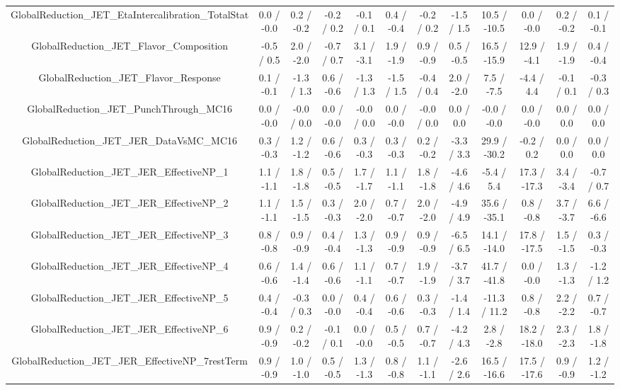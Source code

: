 \begin{table}[htbp]
\begin{center}
\begin{tabular}{|c|c|c|c|c|c|c|c|c|c|c|c|}
  GlobalReduction_JET_EtaIntercalibration_TotalStat & 0.0 / -0.0 & 0.2 / -0.2 & -0.2 / 0.2 & -0.1 / 0.1 & 0.4 / -0.4 & -0.2 / 0.2 & -1.5 / 1.5 & 10.5 / -10.5 & 0.0 / -0.0 & 0.2 / -0.2 & 0.1 / -0.1 \\ 
  GlobalReduction_JET_Flavor_Composition & -0.5 / 0.5 & 2.0 / -2.0 & -0.7 / 0.7 & 3.1 / -3.1 & 1.9 / -1.9 & 0.9 / -0.9 & 0.5 / -0.5 & 16.5 / -15.9 & 12.9 / -4.1 & 1.9 / -1.9 & 0.4 / -0.4 \\ 
  GlobalReduction_JET_Flavor_Response & 0.1 / -0.1 & -1.3 / 1.3 & 0.6 / -0.6 & -1.3 / 1.3 & -1.5 / 1.5 & -0.4 / 0.4 & 2.0 / -2.0 & 7.5 / -7.5 & -4.4 / 4.4 & -0.1 / 0.1 & -0.3 / 0.3 \\ 
  GlobalReduction_JET_PunchThrough_MC16 & 0.0 / -0.0 & -0.0 / 0.0 & 0.0 / -0.0 & -0.0 / 0.0 & 0.0 / -0.0 & -0.0 / 0.0 & 0.0 / 0.0 & -0.0 / -0.0 & 0.0 / -0.0 & 0.0 / 0.0 & 0.0 / 0.0 \\ 
  GlobalReduction_JET_JER_DataVsMC_MC16 & 0.3 / -0.3 & 1.2 / -1.2 & 0.6 / -0.6 & 0.3 / -0.3 & 0.3 / -0.3 & 0.2 / -0.2 & -3.3 / 3.3 & 29.9 / -30.2 & -0.2 / 0.2 & 0.0 / 0.0 & 0.0 / 0.0 \\ 
  GlobalReduction_JET_JER_EffectiveNP_1 & 1.1 / -1.1 & 1.8 / -1.8 & 0.5 / -0.5 & 1.7 / -1.7 & 1.1 / -1.1 & 1.8 / -1.8 & -4.6 / 4.6 & -5.4 / 5.4 & 17.3 / -17.3 & 3.4 / -3.4 & -0.7 / 0.7 \\ 
  GlobalReduction_JET_JER_EffectiveNP_2 & 1.1 / -1.1 & 1.5 / -1.5 & 0.3 / -0.3 & 2.0 / -2.0 & 0.7 / -0.7 & 2.0 / -2.0 & -4.9 / 4.9 & 35.6 / -35.1 & 0.8 / -0.8 & 3.7 / -3.7 & 6.6 / -6.6 \\ 
  GlobalReduction_JET_JER_EffectiveNP_3 & 0.8 / -0.8 & 0.9 / -0.9 & 0.4 / -0.4 & 1.3 / -1.3 & 0.9 / -0.9 & 0.9 / -0.9 & -6.5 / 6.5 & 14.1 / -14.0 & 17.8 / -17.5 & 1.5 / -1.5 & 0.3 / -0.3 \\ 
  GlobalReduction_JET_JER_EffectiveNP_4 & 0.6 / -0.6 & 1.4 / -1.4 & 0.6 / -0.6 & 1.1 / -1.1 & 0.7 / -0.7 & 1.9 / -1.9 & -3.7 / 3.7 & 41.7 / -41.8 & 0.0 / -0.0 & 1.3 / -1.3 & -1.2 / 1.2 \\ 
  GlobalReduction_JET_JER_EffectiveNP_5 & 0.4 / -0.4 & -0.3 / 0.3 & 0.0 / -0.0 & 0.4 / -0.4 & 0.6 / -0.6 & 0.3 / -0.3 & -1.4 / 1.4 & -11.3 / 11.2 & 0.8 / -0.8 & 2.2 / -2.2 & 0.7 / -0.7 \\ 
  GlobalReduction_JET_JER_EffectiveNP_6 & 0.9 / -0.9 & 0.2 / -0.2 & -0.1 / 0.1 & 0.0 / -0.0 & 0.5 / -0.5 & 0.7 / -0.7 & -4.2 / 4.3 & 2.8 / -2.8 & 18.2 / -18.0 & 2.3 / -2.3 & 1.8 / -1.8 \\ 
  GlobalReduction_JET_JER_EffectiveNP_7restTerm & 0.9 / -0.9 & 1.0 / -1.0 & 0.5 / -0.5 & 1.3 / -1.3 & 0.8 / -0.8 & 1.1 / -1.1 & -2.6 / 2.6 & 16.5 / -16.6 & 17.5 / -17.6 & 0.9 / -0.9 & 1.2 / -1.2 \\ 

\end{tabular}
\end{center}
\end{table}
